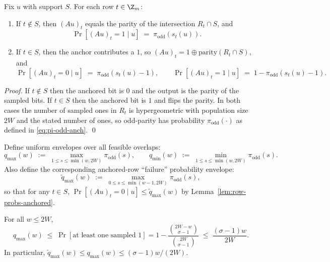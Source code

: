 \begin{lemma}
\label{lem:row-probs-anchored}
Fix $u$ with support $S$.
For each row $t\in\Z_m$:
\begin{enumerate}
\item If $t\notin S$, then $(Au)_t$ equals the parity of the intersection $R_t\cap S$, and
\[
\Pr[(Au)_t=1\mid u] \;=\; \pi_{\mathrm{odd}}(s_t(u)).
\]
\item If $t\in S$, then the anchor contributes a $1$, so $(Au)_t = 1 \oplus \mathrm{parity}(R_t\cap S)$, and
\[
\Pr[(Au)_t=0\mid u] \;=\; \pi_{\mathrm{odd}}(s_t(u)-1),
\qquad
\Pr[(Au)_t=1\mid u] \;=\; 1-\pi_{\mathrm{odd}}(s_t(u)-1).
\]
\end{enumerate}
\end{lemma}

\begin{proof}
If $t\notin S$ then the anchored bit is $0$ and the output is the parity of the sampled bits.
If $t\in S$ then the anchored bit is $1$ and flips the parity. In both cases the number of sampled ones in $R_t$ is
hypergeometric with population size $2W$ and the stated number of ones, so odd-parity has probability
$\pi_{\mathrm{odd}}(\cdot)$ as defined in \eqref{eq:pi-odd-anch}. \qed
\end{proof}

Define uniform envelopes over all feasible overlaps:
\begin{equation}
q_{\max}(w)\;:=\;\max_{1\le s\le \min(w,2W)} \pi_{\mathrm{odd}}(s),
\qquad
q_{\min}(w)\;:=\;\min_{1\le s\le \min(w,2W)} \pi_{\mathrm{odd}}(s).
\label{eq:qmin-qmax-anch}
\end{equation}
Also define the corresponding anchored-row ``failure'' probability envelope:
\begin{equation}
\widetilde q_{\max}(w)\;:=\;\max_{0\le s\le \min(w-1,2W)} \pi_{\mathrm{odd}}(s),
\label{eq:qtilde-anch}
\end{equation}
so that for any $t\in S$, $\Pr[(Au)_t=0\mid u]\le \widetilde q_{\max}(w)$ by Lemma~\ref{lem:row-probs-anchored}.

\begin{lemma}
\label{lem:envelope-bounds-anch}
For all $w\le 2W$,
\[
q_{\max}(w)\;\le\; \Pr[\text{at least one sampled 1}]
=1-\frac{\binom{2W-w}{\sigma-1}}{\binom{2W}{\sigma-1}}
\;\le\; \frac{(\sigma-1)w}{2W}.
\]
In particular, $\widetilde q_{\max}(w)\le q_{\max}(w)\le (\sigma-1)w/(2W)$.
\end{lemma}

